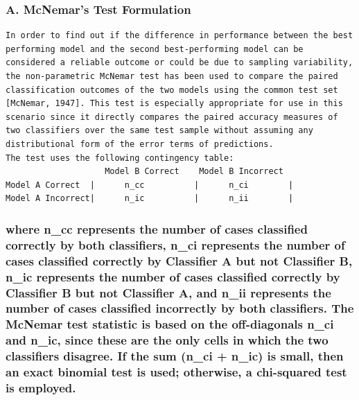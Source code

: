 \subsubsection{A. McNemar's Test
Formulation}\label{a.-mcnemars-test-formulation}

\begin{verbatim}
In order to find out if the difference in performance between the best performing model and the second best-performing model can be considered a reliable outcome or could be due to sampling variability, the non-parametric McNemar test has been used to compare the paired classification outcomes of the two models using the common test set [McNemar, 1947]. This test is especially appropriate for use in this scenario since it directly compares the paired accuracy measures of two classifiers over the same test sample without assuming any distributional form of the error terms of predictions.
The test uses the following contingency table:
                    Model B Correct    Model B Incorrect
Model A Correct  |      n_cc          |      n_ci        |
Model A Incorrect|      n_ic          |      n_ii        |
\end{verbatim}

\subsubsection{where n\_cc represents the number of cases classified
correctly by both classifiers, n\_ci represents the number of cases
classified correctly by Classifier A but not Classifier B, n\_ic
represents the number of cases classified correctly by Classifier B but
not Classifier A, and n\_ii represents the number of cases classified
incorrectly by both classifiers. The McNemar test statistic is based on
the off-diagonals n\_ci and n\_ic, since these are the only cells in
which the two classifiers disagree. If the sum (n\_ci + n\_ic) is small,
then an exact binomial test is used; otherwise, a chi-squared test is
employed.}\label{where-n_cc-represents-the-number-of-cases-classified-correctly-by-both-classifiers-n_ci-represents-the-number-of-cases-classified-correctly-by-classifier-a-but-not-classifier-b-n_ic-represents-the-number-of-cases-classified-correctly-by-classifier-b-but-not-classifier-a-and-n_ii-represents-the-number-of-cases-classified-incorrectly-by-both-classifiers.-the-mcnemar-test-statistic-is-based-on-the-off-diagonals-n_ci-and-n_ic-since-these-are-the-only-cells-in-which-the-two-classifiers-disagree.-if-the-sum-n_ci-n_ic-is-small-then-an-exact-binomial-test-is-used-otherwise-a-chi-squared-test-is-employed.}

